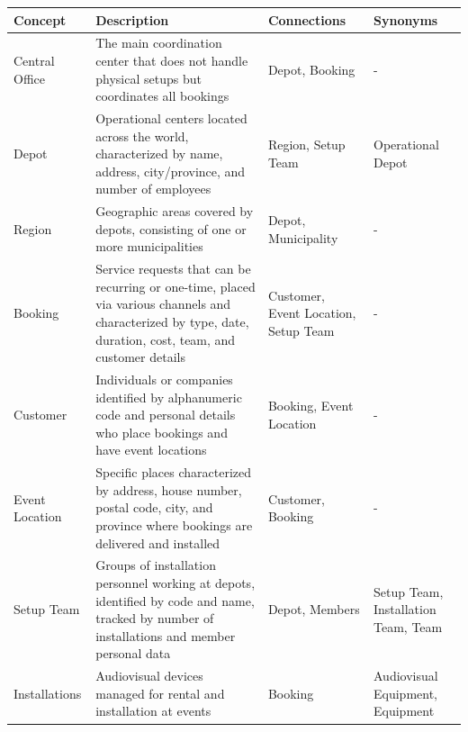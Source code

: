 \begin{table}[H]
\centering
\begin{tabular}{|p{2.2cm}|p{4cm}|p{3.5cm}|p{3.5cm}|}
\hline
\textbf{Concept} & \textbf{Description} & \textbf{Connections} & \textbf{Synonyms} \\
\hline
Central Office & The main coordination center that does not handle physical setups but coordinates all bookings & Depot, Booking & - \\
\hline
Depot & Operational centers located across the world, characterized by name, address, city/province, and number of employees & Region, Setup Team & Operational Depot \\
\hline
Region & Geographic areas covered by depots, consisting of one or more municipalities & Depot, Municipality & - \\
\hline
Booking & Service requests that can be recurring or one-time, placed via various channels and characterized by type, date, duration, cost, team, and customer details & Customer, Event Location, Setup Team & - \\
\hline
Customer & Individuals or companies identified by alphanumeric code and personal details who place bookings and have event locations & Booking, Event Location & - \\
\hline
Event Location & Specific places characterized by address, house number, postal code, city, and province where bookings are delivered and installed & Customer, Booking & - \\
\hline
Setup Team & Groups of installation personnel working at depots, identified by code and name, tracked by number of installations and member personal data & Depot, Members & Setup Team, Installation Team, Team \\
\hline
Installations & Audiovisual devices managed for rental and installation at events & Booking & Audiovisual Equipment, Equipment \\
\hline
\end{tabular}
\end{table}

